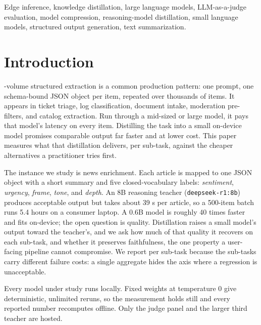 \documentclass[10pt,journal]{IEEEtran}
\begin{document}
\begin{IEEEkeywords}
Edge inference, knowledge distillation, large language models, LLM-as-a-judge evaluation, model compression, reasoning-model distillation, small language models, structured output generation, text summarization.
\end{IEEEkeywords}

\section{Introduction}\label{sec:intro}
-volume structured extraction is a common production pattern: one prompt, one schema-bound JSON object per item, repeated over thousands of items. It appears in ticket triage, log classification, document intake, moderation pre-filters, and catalog extraction. Run through a mid-sized or large model, it pays that model's latency on every item. Distilling the task into a small on-device model promises comparable output far faster and at lower cost. This paper measures what that distillation delivers, per sub-task, against the cheaper alternatives a practitioner tries first.

The instance we study is news enrichment. Each article is mapped to one JSON object with a short summary and five closed-vocabulary labels: \emph{sentiment}, \emph{urgency}, \emph{frame}, \emph{tone}, and \emph{depth}. An 8B reasoning teacher (\texttt{deepseek-r1:8b}) produces acceptable output but takes about 39 s per article, so a 500-item batch runs 5.4 hours on a consumer laptop. A 0.6B model is roughly 40 times faster and fits on-device; the open question is quality. Distillation raises a small model's output toward the teacher's, and we ask how much of that quality it recovers on each sub-task, and whether it preserves faithfulness, the one property a user-facing pipeline cannot compromise. We report per sub-task because the sub-tasks carry different failure costs: a single aggregate hides the axis where a regression is unacceptable.

Every model under study runs locally. Fixed weights at temperature 0 give deterministic, unlimited reruns, so the measurement holds still and every reported number recomputes offline. Only the judge panel and the larger third teacher are hosted.
\end{document}
